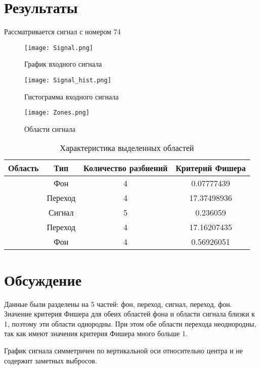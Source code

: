 \documentclass[12pt,a4paper]{article}
\begin{document}
\section {Результаты}
Рассматривается сигнал с номером 74
\begin{figure}[H]
    \centering
    \texttt{[image: Signal.png]}
    \caption{График входного сигнала}
\end{figure}
\begin{figure}[H]
    \centering
    \texttt{[image: Signal\_hist.png]}
    \caption{Гистограмма входного сигнала}
\end{figure}
\begin{figure}[H]
    \centering
    \texttt{[image: Zones.png]}
    \caption{Области сигнала}
\end{figure}
\begin{table}[H]
    \centering
    \begin{tabular}{|c|c|c|c|}
        \hline
        Область & Тип & Количество разбиений & Критерий Фишера\\\hline
        [0, 239] & Фон & 4 & 0.07777439\\\hline
        [239, 307] & Переход & 4 & 17.37498936\\\hline
        [307, 732] & Сигнал & 5 & 0.236059\\\hline
        [732, 800] & Переход & 4 & 17.16207435\\\hline
        [800, 1023] & Фон & 4 & 0.56926051\\\hline
    \end{tabular}
    \caption{Характеристика выделенных областей}
\end{table}

\section{Обсуждение}
Данные были разделены на 5 частей: фон, переход, сигнал, переход, фон. Значение критерия Фишера для обеих областей фона и области сигнала близки к 1, поэтому эти области однородны. При этом обе области перехода неоднородны, так как имеют значения критерия Фишера много больше 1.

График сигнала симметричен по вертикальной оси относительно центра и не содержит заметных выбросов.
\end{document}
